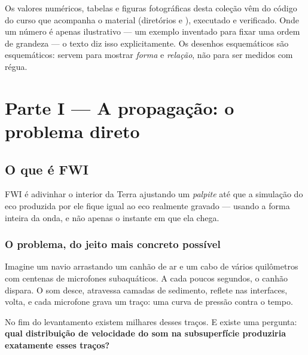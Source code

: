 \documentclass[11pt,a4paper,oneside]{report}
\begin{document}
Os valores num\'ericos, tabelas e figuras fotogr\'aficas desta cole\c{c}\~ao
v\^em do c\'odigo do curso que acompanha o material (diret\'orios
 e ), executado e verificado. Onde um n\'umero \'e
apenas ilustrativo --- um exemplo inventado para fixar uma ordem de grandeza
--- o texto diz isso explicitamente. Os desenhos esquem\'aticos s\~ao
esquem\'aticos: servem para mostrar \emph{forma} e \emph{rela\c{c}\~ao}, n\~ao
para ser medidos com r\'egua.

\part*{\centering\color{azulfwi} Parte I --- A propaga\c{c}\~ao: o problema direto}

\chapter{O que \'e FWI}
\label{cap:oque}

\begin{ideia}
FWI \'e adivinhar o interior da Terra ajustando um \emph{palpite} at\'e que a
simula\c{c}\~ao do eco produzida por ele fique igual ao eco realmente
gravado --- usando a forma inteira da onda, e n\~ao apenas o instante em que
ela chega.
\end{ideia}

\section{O problema, do jeito mais concreto poss\'ivel}

Imagine um navio arrastando um canh\~ao de ar e um cabo de v\'arios
quil\^ometros com centenas de microfones subaqu\'aticos. A cada poucos
segundos, o canh\~ao dispara. O som desce, atravessa camadas de sedimento,
reflete nas interfaces, volta, e cada microfone grava um tra\c{c}o: uma curva
de press\~ao contra o tempo.

No fim do levantamento existem milhares desses tra\c{c}os. E existe uma
pergunta: \textbf{qual distribui\c{c}\~ao de velocidade do som na
subsuperf\'icie produziria exatamente esses tra\c{c}os?}
\end{document}
